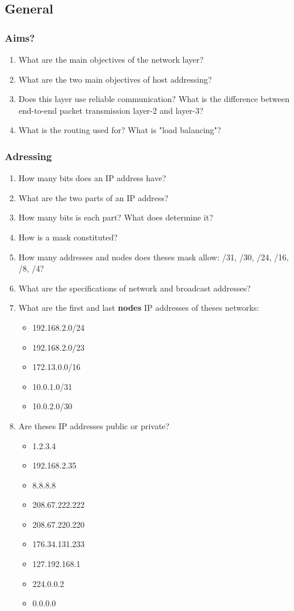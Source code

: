 \documentclass[11pt]{article}
\begin{document}
\subsection{General}
\subsubsection{Aims?}
\begin{enumerate}
  \item What are the main objectives of the network layer?
  \item What are the two main objectives of host addressing?
  \item Does this layer use reliable communication? What is the difference between end-to-end packet transmission layer-2 and layer-3?
  \item What is the routing used for? What is "load balancing"?
\end{enumerate}
\subsubsection{Adressing}
\begin{enumerate}
  \item How many bits does an IP address have?
  \item What are the two parts of an IP address?
  \item How many bits is each part? What does determine it?
  \item How is a mask constituted?
  \item How many addresses and nodes does theses mask allow: /31, /30, /24, /16, /8, /4?
  \item What are the specifications of network and broadcast addresses?
  \item What are the first and last \textbf{nodes} IP addresses of theses networks:
    \begin{itemize}
      \item 192.168.2.0/24
      \item 192.168.2.0/23
      \item 172.13.0.0/16
      \item 10.0.1.0/31
      \item 10.0.2.0/30
    \end{itemize}
  \item Are theses IP addresses public or private?
    \begin{itemize}
      \item 1.2.3.4
      \item 192.168.2.35
      \item 8.8.8.8
      \item 208.67.222.222
      \item 208.67.220.220
      \item 176.34.131.233
      \item 127.192.168.1
      \item 224.0.0.2
      \item 0.0.0.0
    \end{itemize}
\end{enumerate}
\end{document}
